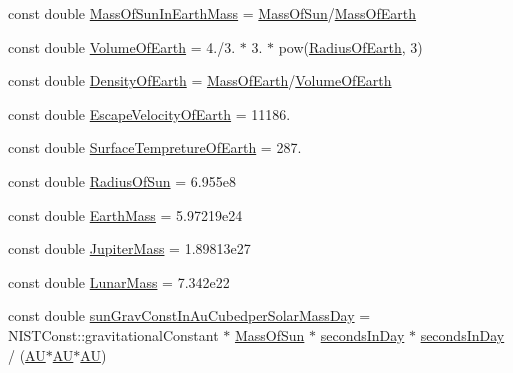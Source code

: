 \begin{DoxyCompactItemize}
\item 
const double \mbox{\hyperlink{namespace_e_g_x_phys_a05709972a6a6089eb968f667ce0bf656}{Mass\+Of\+Sun\+In\+Earth\+Mass}} = \mbox{\hyperlink{namespace_e_g_x_phys_a6e84ae13f1dbcecb215af787bbc12cd6}{Mass\+Of\+Sun}}/\mbox{\hyperlink{namespace_e_g_x_phys_ace4a9d8c0b21215536857f4c1087a4e8}{Mass\+Of\+Earth}}
\item 
const double \mbox{\hyperlink{namespace_e_g_x_phys_a73aaaddeacf5d59643ec5e4a53a1a251}{Volume\+Of\+Earth}} = 4./3. $\ast$ 3. $\ast$ pow(\mbox{\hyperlink{namespace_e_g_x_phys_a11a2d4a914eb43c4095e225358293a45}{Radius\+Of\+Earth}}, 3)
\item 
const double \mbox{\hyperlink{namespace_e_g_x_phys_a2a671e37351b9b7e334385a26a7f7102}{Density\+Of\+Earth}} = \mbox{\hyperlink{namespace_e_g_x_phys_ace4a9d8c0b21215536857f4c1087a4e8}{Mass\+Of\+Earth}}/\mbox{\hyperlink{namespace_e_g_x_phys_a73aaaddeacf5d59643ec5e4a53a1a251}{Volume\+Of\+Earth}}
\item 
const double \mbox{\hyperlink{namespace_e_g_x_phys_a6a8cb7abae15a2f1bbcfd6623f72316c}{Escape\+Velocity\+Of\+Earth}} = 11186.
\item 
const double \mbox{\hyperlink{namespace_e_g_x_phys_a942ce2ac76b5df8b08ec7827d3e20b76}{Surface\+Tempreture\+Of\+Earth}} = 287.
\item 
const double \mbox{\hyperlink{namespace_e_g_x_phys_a983b842cceb4a584787874fc9486384d}{Radius\+Of\+Sun}} = 6.\+955e8
\item 
const double \mbox{\hyperlink{namespace_e_g_x_phys_a9f866a7985fe2676a1e50a3dd175f5b6}{Earth\+Mass}} = 5.\+97219e24
\item 
const double \mbox{\hyperlink{namespace_e_g_x_phys_ad790be322eb318e95b4ea609b4954da9}{Jupiter\+Mass}} = 1.\+89813e27
\item 
const double \mbox{\hyperlink{namespace_e_g_x_phys_a55e13f18ccd52a098969eaa5755c448e}{Lunar\+Mass}} = 7.\+342e22
\item 
const double \mbox{\hyperlink{namespace_e_g_x_phys_ad6c3d6fda98ef1efd005dd096890e981}{sun\+Grav\+Const\+In\+Au\+Cubedper\+Solar\+Mass\+Day}} = N\+I\+S\+T\+Const\+::gravitational\+Constant $\ast$ \mbox{\hyperlink{namespace_e_g_x_phys_a6e84ae13f1dbcecb215af787bbc12cd6}{Mass\+Of\+Sun}} $\ast$ \mbox{\hyperlink{namespace_e_g_x_phys_ab4f86327f64403b843077ecc189ce52b}{seconds\+In\+Day}} $\ast$ \mbox{\hyperlink{namespace_e_g_x_phys_ab4f86327f64403b843077ecc189ce52b}{seconds\+In\+Day}} / (\mbox{\hyperlink{namespace_e_g_x_phys_a999332303a2214425184fbe23dbae0c5}{AU}}$\ast$\mbox{\hyperlink{namespace_e_g_x_phys_a999332303a2214425184fbe23dbae0c5}{AU}}$\ast$\mbox{\hyperlink{namespace_e_g_x_phys_a999332303a2214425184fbe23dbae0c5}{AU}})

\end{DoxyCompactItemize}
